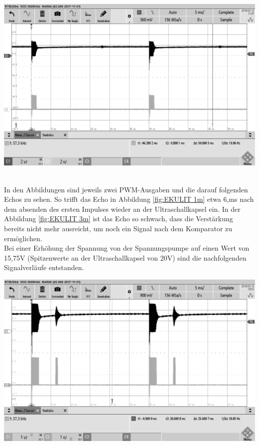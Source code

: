 \begin{minipage}{0.5\textwidth}
\includegraphics[width=1\textwidth%
]{Abbildungen/MessungenP2/10V/EKULIT3m.png}
\label{fig:EKULIT 3m}
\end{minipage}\\
In den Abbildungen sind jeweils zwei PWM-Ausgaben und die darauf folgenden Echos zu sehen. So trifft das Echo in Abbildung \ref{fig:EKULIT 1m} etwa 6,ms nach dem absenden des ersten Impulses  wieder an der Ultraschallkapsel ein. In der Abbildung \ref{fig:EKULIT 3m} ist das Echo so schwach, dass die Verstärkung bereits nicht mehr ausreicht, um noch ein Signal nach dem Komparator zu ermöglichen.\\
Bei einer Erhöhung der Spannung von der Spannungspumpe auf einen Wert von 15,75V (Spitzenwerte an der Ultraschallkapsel von 20V) sind die nachfolgenden Signalverläufe entstanden.\\
\begin{minipage}{0.5\textwidth}
\includegraphics[width=1\textwidth%
]{Abbildungen/MessungenP2/15,75V/EKULIT1m.png}
\label{fig:EKULIT2 1m}
\end{minipage}
